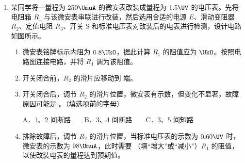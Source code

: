 \documentclass[\gkver]{gaokaozhenti}
\begin{document}
\begin{enumerate}
{$v=\frac{40\times10^{-2}\Um}{6\Us}=\frac{1}{15}\Ums$

小球下落过程中受到竖直向下的重力、竖直向上的浮力和阻力，小球做匀速直线运动，受力平衡

$mg=kv+\rho gV$

式中 $\rho gV$ 表示液体对小球的浮力，代入数据可得比例系数

$k=\frac{mg-\rho gV}{v}=\frac{4.0\times10^{-6}\times9.8-8.0\times10^{2}\times9.8\times5.0\times10^{-10}}{\frac{1}{15}}\Ukgs=5.292\times10^{-4}\Ukgs$

（3）若选择一个密度更大、体积相同的小球，浮力 $\rho gV$ 不变，根据 $m=\rho V$ 可知小球的质量增大，根据平衡方程 $mg=kv+\rho gV$ 可知小球的速度增大，所以在相同的时间内小球下落的高度增大，所以该直线可能是图象中的①虚线。
}

\item
某同学将一量程为 $250\UmuA$ 的微安表改装成量程为 $1.5\UV$ 的电压表。先将电阻箱 $R_1$ 与该微安表串联进行改装，然后选用合适的电源 $E$、滑动变阻器 $R_2$、定值电阻 $R_3$、开关 S 和标准电压表对改装后的电表进行检测，设计电路如图所示。


\begin{enumerate}
	\item
	微安表铭牌标示内阻为 $0.8\UkO$，据此计算 $R_1$ 的阻值应为  $\UkO$。按照电路图连接电路，并将 $R_1$ 调为该阻值。
	\item
	开关闭合前，$R_2$ 的滑片应移动到  端。
	\item
	开关闭合后，调节 $R_2$ 的滑片位置，微安表有示数，但变化不显著，故障原因可能是 。（填选项前的字母）

	A．1、2 间断路　　B．3、4 间断路　　C．3、5 间短路
	\item
	排除故障后，调节 $R_2$ 的滑片位置，当标准电压表的示数为 $0.60\UV$ 时，微安表的示数为 $98\UmuA$，此时需要 （填“增大”或“减小”）$R_1$ 的阻值，以使改装电表的量程达到预期值。
\end{enumerate}

\end{enumerate}
\end{document}
